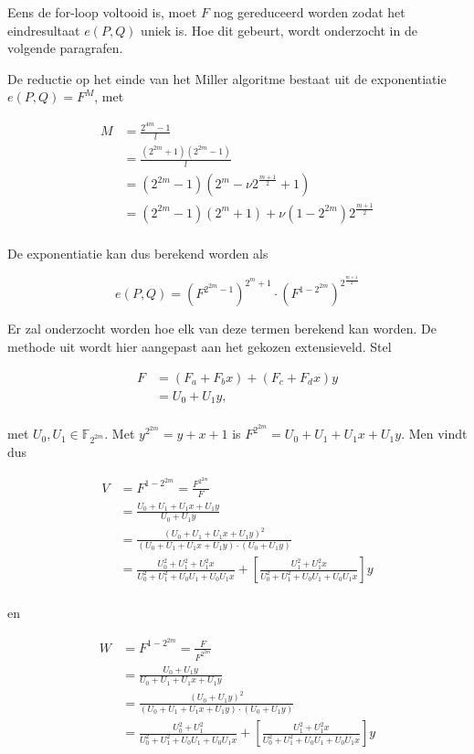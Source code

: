 Eens de for-loop voltooid is, moet $F$ nog gereduceerd worden zodat het eindresultaat $e(P, Q)$ uniek is. Hoe dit gebeurt, wordt onderzocht in de volgende paragrafen.

De reductie op het einde van het Miller algoritme bestaat uit de exponentiatie $e(P, Q) = F^M$, met

\[\begin{aligned}
M	&= \frac{2^{4m} - 1}{l}\\
	&= \frac{(2^{2m} + 1)(2^{2m} - 1)}{l}\\
	&= (2^{2m} - 1)(2^m - \nu 2^{\frac{m + 1}{2}} + 1)\\
	&= (2^{2m} - 1)(2^m + 1) + \nu(1 - 2^{2m})2^{\frac{m + 1}{2}}\\
\end{aligned}\]

De exponentiatie kan dus berekend worden als

\[e(P, Q) = \left(F^{2^{2m} - 1}\right)^{2^m + 1} \cdot \left(F^{1 - 2^{2m}}\right)^{2^{\frac{m + 1}{2}}}\]

Er zal onderzocht worden hoe elk van deze termen berekend kan worden. De methode uit \cite{beuchat} wordt hier aangepast aan het gekozen extensieveld. Stel

\[\begin{aligned}
F	&= (F_a + F_b x) + (F_c + F_d x)y\\
	&= U_0 + U_1y,\\
\end{aligned}\]

met $U_0, U_1 \in \mathbb{F}_{2^{2m}}$. Met $y^{2^{2m}} = y + x + 1$ is $F^{2^{2m}} = U_0 + U_1 + U_1x + U_1y$. Men vindt dus 

\[\begin{aligned}
V  &= F^{1 - 2^{2m}} = \frac{F^{2^{2m}}}{F}\\
	&= \frac{U_0 + U_1 + U_1x + U_1y}{U_0 + U_1y}\\
	&= \frac{(U_0 + U_1 + U_1x + U_1y)^2}{(U_0 + U_1 + U_1x + U_1y) \cdot (U_0 + U_1y)}\\
	&= \frac{U_0^2 + U_1^2 + U_1^2x}{U_0^2 + U_1^2 + U_0 U_1 + U_0 U_1 x} + \left[\frac{U_1^2 + U_1^2x}{U_0^2 + U_1^2 + U_0 U_1 + U_0 U_1 x}\right]y\\
\end{aligned}\]

en

\[\begin{aligned}
W  &= F^{1 - 2^{2m}} = \frac{F}{F^{2^{2m}}}\\
	&= \frac{U_0 + U_1y}{U_0 + U_1 + U_1x + U_1y}\\
	&= \frac{(U_0 + U_1y)^2}{(U_0 + U_1 + U_1x + U_1y) \cdot (U_0 + U_1y)}\\
	&= \frac{U_0^2 + U_1^2}{U_0^2 + U_1^2 + U_0 U_1 + U_0 U_1 x} + \left[\frac{U_1^2 + U_1^2x}{U_0^2 + U_1^2 + U_0 U_1 + U_0 U_1 x}\right]y\\
\end{aligned}\]

